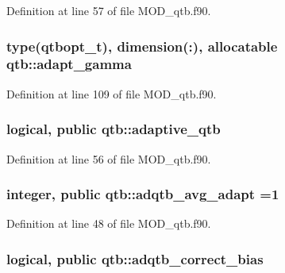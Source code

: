 Definition at line 57 of file M\-O\-D\-\_\-qtb.\-f90.

\hypertarget{classqtb_a175b26fb3570a3faedd3c49a5d8bd3e6}{
\subsubsection[{adapt\-\_\-gamma}]{\setlength{\rightskip}{0pt plus 5cm}type({\bf qtbopt\-\_\-t}), dimension(\-:), allocatable qtb\-::adapt\-\_\-gamma}}\label{classqtb_a175b26fb3570a3faedd3c49a5d8bd3e6}


Definition at line 109 of file M\-O\-D\-\_\-qtb.\-f90.

\hypertarget{classqtb_af03b69a3cd5c3be7a38b14ebeed3550e}{
\subsubsection[{adaptive\-\_\-qtb}]{\setlength{\rightskip}{0pt plus 5cm}logical, public qtb\-::adaptive\-\_\-qtb}}\label{classqtb_af03b69a3cd5c3be7a38b14ebeed3550e}


Definition at line 56 of file M\-O\-D\-\_\-qtb.\-f90.

\hypertarget{classqtb_a3061f570614f506a5d914fc862275c0c}{
\subsubsection[{adqtb\-\_\-avg\-\_\-adapt}]{\setlength{\rightskip}{0pt plus 5cm}integer, public qtb\-::adqtb\-\_\-avg\-\_\-adapt =1}}\label{classqtb_a3061f570614f506a5d914fc862275c0c}


Definition at line 48 of file M\-O\-D\-\_\-qtb.\-f90.

\hypertarget{classqtb_a6ee3dbfa7ec54c120520bb6f65eda7ac}{
\subsubsection[{adqtb\-\_\-correct\-\_\-bias}]{\setlength{\rightskip}{0pt plus 5cm}logical, public qtb\-::adqtb\-\_\-correct\-\_\-bias}}\label{classqtb_a6ee3dbfa7ec54c120520bb6f65eda7ac}


